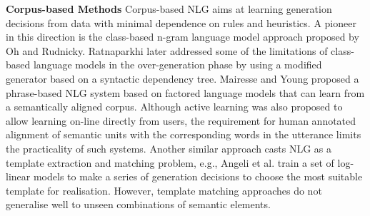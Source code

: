 \documentclass[10pt,twocolumn,letterpaper]{article}
\begin{document}
\textbf{Corpus-based Methods} Corpus-based NLG aims at learning generation decisions from data with minimal dependence on rules and heuristics. A pioneer in this direction is the class-based n-gram language model approach proposed by Oh and Rudnicky\cite{oh2000stochastic}. Ratnaparkhi  \cite{ratnaparkhi2002trainable}later addressed some of the limitations of class-based language models in the over-generation phase by using a modified generator based on a syntactic dependency tree. Mairesse and Young\cite{mairesse2014stochastic} proposed a phrase-based NLG system based on factored language models that can learn from a semantically aligned corpus. Although active learning \cite{mairesse2010phrase}was also proposed to allow learning on-line directly from users, the requirement for human annotated alignment of semantic units with the corresponding words in the utterance limits the practicality of such systems. Another similar approach casts NLG as a template extraction and matching problem, e.g., Angeli et al. \cite{angeli2010simple} train a set of log-linear models to make a series of generation decisions to choose the most suitable template for realisation.  However, template matching approaches do not generalise well to unseen combinations of semantic elements.
\end{document}
